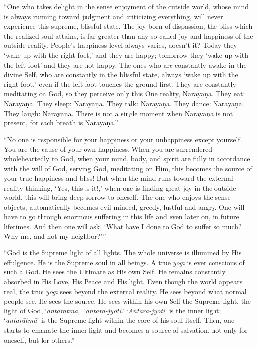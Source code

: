 \enquote{One who takes delight in the sense enjoyment of the outside world, whose mind is always running toward judgment and criticizing everything, will never experience this supreme, blissful state. The joy born of dispassion, the bliss which the realized soul attains, is far greater than any so-called joy and happiness of the outside reality. People’s happiness level always varies, doesn’t it? Today they \enquote{wake up with the right foot,} and they are happy; tomorrow they \enquote{wake up with the left foot} and they are not happy. The ones who are constantly awake in the divine Self, who are constantly in the blissful state, always \enquote{wake up with the right foot,} even if the left foot touches the ground first. They are constantly meditating on God, so they perceive only this One reality, Nārāyaṇa. They eat: Nārāyaṇa. They sleep: Nārāyaṇa. They talk: Nārāyaṇa. They dance: Nārāyaṇa. They laugh: Nārāyaṇa. There is not a single moment when Nārāyaṇa is not present, for each breath is Nārāyaṇa.}

\enquote{No one is responsible for your happiness or your unhappiness except yourself. You are the cause of your own happiness. When you are surrendered wholeheartedly to God, when your mind, body, and spirit are fully in accordance with the will of God, serving God, meditating on Him, this becomes the source of your true happiness and bliss! But when the mind runs toward the external reality thinking, \enquote{Yes, this is it!,} when one is finding great joy in the outside world, this will bring deep sorrow to oneself. The one who enjoys the sense objects, automatically becomes evil-minded, greedy, lustful and angry. One will have to go through enormous suffering in this life and even later on, in future lifetimes. And then one will ask, \enquote{What have I done to God to suffer so much? Why me, and not my neighbor?}}

\enquote{God is the Supreme light of all lights. The whole universe is illumined by His effulgence. He is the Supreme soul in all beings. A true \textit{yogī} is ever conscious of such a God. He sees the Ultimate as His own Self. He remains constantly absorbed in His Love, His Peace and His light. Even though the world appears real, the true \textit{yogī} sees beyond the external reality. He sees beyond what normal people see. He sees the source. He sees within his own Self the Supreme light, the light of God, \enquote{\textit{antarātmā},} \enquote{\textit{antara-jyoti}.} \enquote{\textit{Antara-jyoti}} is the inner light; \enquote{\textit{antarātmā}} is the Supreme light within the core of his soul itself. Then, one starts to emanate the inner light and becomes a source of salvation, not only for oneself, but for others.}

